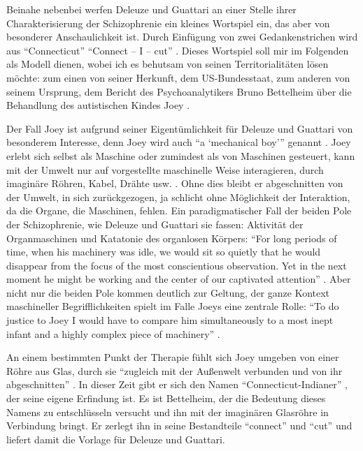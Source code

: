 \documentclass[12pt,
               paper=a4,
               twoside=false,
               onehalfspacing,
               bibliography=totoc,
               toc=graduated,
               ]{scrartcl}
\newcommand{\pc}[2]{\parencite[#1]{#2}}
\newcommand{\vgl}[2]{\parencite[vgl.][#1]{#2}}
\newcommand{\cic}{Connect -- I -- cut\xspace}
\newcommand{\dg}{Deleuze und Guattari\xspace}
\begin{document}
Beinahe nebenbei werfen \dg an einer Stelle ihrer Charakterisierung
der Schizophrenie ein kleines Wortspiel ein, das aber von besonderer
Anschaulichkeit ist. Durch Einfügung von zwei Gedankenstrichen wird
aus "`Connecticut"' "`\cic"' \pc{48}{ao}. Dieses Wortspiel soll mir im
Folgenden als Modell dienen, wobei ich es behutsam von seinen
Territorialitäten lösen möchte: zum einen von seiner Herkunft, dem
US-Bundesstaat, zum anderen von seinem Ursprung, dem Bericht des
Psychoanalytikers Bruno Bettelheim über die Behandlung des
autistischen Kindes Joey \parencites[vgl.][]{joey}[306-446]{emptyf}.

Der Fall Joey ist aufgrund seiner Eigentümlichkeit für \dg von
besonderem Interesse, denn Joey wird auch \enquote{a
\enquote{mechanical boy}} genannt \pc{3}{joey}. Joey erlebt sich
selbst als Maschine oder zumindest als von Maschinen gesteuert, kann
mit der Umwelt nur auf vorgestellte maschinelle Weise interagieren,
durch imaginäre Röhren, Kabel, Drähte usw. \vgl{3}{joey}. Ohne dies
bleibt er abgeschnitten von der Umwelt, in sich zurückgezogen, ja
schlicht ohne Möglichkeit der Interaktion, da die  Organe, die
Maschinen, fehlen. Ein paradigmatischer Fall der beiden Pole der
Schizophrenie, wie \dg sie fassen: Aktivität der Organmaschinen und
Katatonie des organlosen Körpers: "`For long periods of time, when his
\glq machinery\grq{} was idle, we would sit so quietly that he would
disappear from the focus of the most conscientious observation. Yet in
the next moment he might be \glq working\grq{} and the center of our
captivated attention"' \pc{3}{joey}. Aber nicht nur die beiden Pole
kommen deutlich zur Geltung, der ganze Kontext maschineller
Begrifflichkeiten spielt im Falle Joeys eine zentrale Rolle: "`To do
justice to Joey I would have to compare him simultaneously to a most
inept infant and a highly complex piece of machinery"' \pc{3}{joey}.

An einem bestimmten Punkt der Therapie \vgl{398-404}{emptyf} fühlt
sich Joey umgeben von einer Röhre aus Glas, durch sie "`zugleich mit
der Außenwelt verbunden und von ihr abgeschnitten"' \pc{399}{emptyf}.
In dieser Zeit gibt er sich den Namen "`Connecticut-Indianer"'
\pc{399}{emptyf}, der seine eigene Erfindung ist. Es ist Bettelheim,
der die Bedeutung dieses Namens zu entschlüsseln versucht und ihn mit
der imaginären Glasröhre in Verbindung bringt. Er zerlegt ihn in seine
Bestandteile "`connect"' und "`cut"' \vgl{399}{emptyf} und liefert
damit die Vorlage für \dg.
\end{document}
